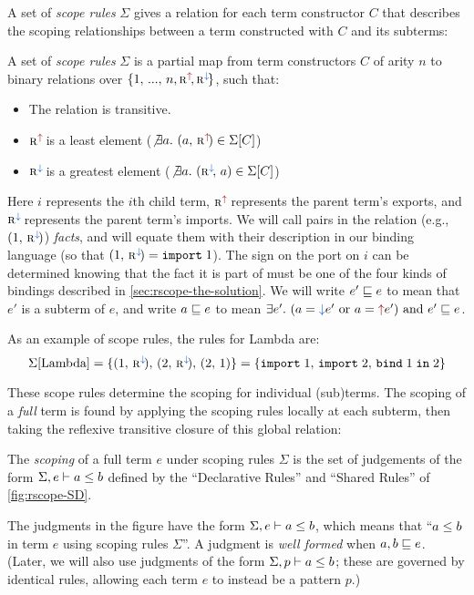A set of \emph{scope rules} $\Sigma$ gives a relation
for each term constructor $C$ that describes the scoping relationships
between a term constructed with $C$ and its subterms:
\begin{definition} \label{def:rscope-scope-rules}
  A set of \emph{scope rules} $\Sigma$ is a partial map from term
  constructors $C$ of arity $n$ to binary relations over
  $\{1,\,...,\,n,\Exp,\Imp\}$, such that:
  \begin{itemize}
  \item The relation is transitive.
  \item $\Exp$ is a least element ($\NotExists{a} (a,\,\Exp) \in \Sigma[C]$)
  \item $\Imp$ is a greatest element ($\NotExists{a} (\Imp,\,a) \in \Sigma[C]$)
  \end{itemize}
\end{definition}
Here $i$ represents the $i$th child term,
$\Exp$ represents the parent term's exports, and
$\Imp$ represents the parent term's imports.
We will call pairs in the relation (e.g., $(1,\,\Imp)$) \emph{facts},
and will equate them with their description in our binding
language (so that $(1,\,\Imp) = \SpecImpt{1}$).
The sign on the port on $i$ can be determined knowing that the fact it is part of must be
one of the four kinds of bindings described in \cref{sec:rscope-the-solution}.
We will write $e' \sqsubseteq e$ to mean that $e'$ is a subterm of $e$,
and write $a \sqsubseteq e$ to mean
$\Exists{e'} (a=\im{e'} \text{ or } a=\ex{e'}) \text{ and } e' \Subterm e$.

As an example of scope rules, the rules for Lambda are:
\[
\Sigma[\text{Lambda}] = \{(1,\,\Imp),\,(2,\,\Imp),\,(2,\,1)\} = \{\SpecImpt{1},\,\SpecImpt{2},\,\SpecBind{2}{1}\}
\]

These scope rules determine the scoping for individual (sub)terms.
The scoping of a \emph{full} term is found by applying the scoping rules
locally at each subterm, then taking the reflexive transitive closure
of this global relation:
\begin{definition}
The \emph{scoping} of a full term $e$ under scoping rules $\Sigma$
is the set of judgements of the form $\Sigma,e \vdash a \le b$
defined by the ``Declarative Rules'' and ``Shared Rules'' of 
\cref{fig:rscope-SD}.
\end{definition}

The judgments in the figure have the form
$\Sigma,e \vdash a \le b$, which means that
``$a \le b$ in term $e$ using scoping rules $\Sigma$''.
A judgment is \emph{well formed} when $a, b \sqsubseteq e$.
(Later, we will also use judgments of the form $\Sigma,p \vdash a \le b$; these
are governed by identical rules, allowing each term $e$ to instead be
a pattern $p$.)

